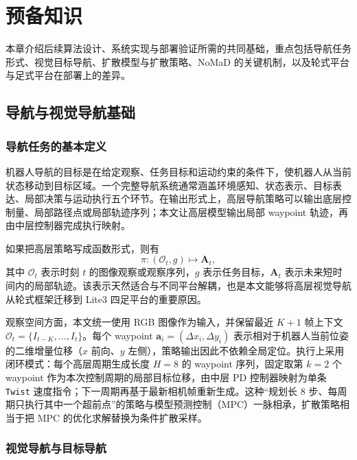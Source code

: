 
\chapter{预备知识}

本章介绍后续算法设计、系统实现与部署验证所需的共同基础，重点包括导航任务形式、视觉目标导航、扩散模型与扩散策略、NoMaD 的关键机制，以及轮式平台与足式平台在部署上的差异。

\section{导航与视觉导航基础}

\subsection{导航任务的基本定义}

机器人导航的目标是在给定观察、任务目标和运动约束的条件下，使机器人从当前状态移动到目标区域。一个完整导航系统通常涵盖环境感知、状态表示、目标表达、局部决策与运动执行五个环节\cite{thrun2005probabilistic,anderson2018evaluation}。在输出形式上，高层导航策略可以输出底层控制量、局部路径点或局部轨迹序列；本文让高层模型输出局部 waypoint 轨迹，再由中层控制器完成执行映射。

如果把高层策略写成函数形式，则有
\begin{equation}
\pi : (\mathcal{O}_t, g) \mapsto \mathbf{A}_t ,
\end{equation}
其中 $\mathcal{O}_t$ 表示时刻 $t$ 的图像观察或观察序列，$g$ 表示任务目标，$\mathbf{A}_t$ 表示未来短时间内的局部轨迹。该表示天然适合与不同平台解耦，也是本文能够将高层视觉导航从轮式框架迁移到 Lite3 四足平台的重要原因。

观察空间方面，本文统一使用 RGB 图像作为输入，并保留最近 $K+1$ 帧上下文 $\mathcal{O}_t = \{I_{t-K}, \ldots, I_t\}$。每个 waypoint $\mathbf{a}_i = (\Delta x_i, \Delta y_i)$ 表示相对于机器人当前位姿的二维增量位移（$x$ 前向、$y$ 左侧），策略输出因此不依赖全局定位。执行上采用闭环模式：每个高层周期生成长度 $H=8$ 的 waypoint 序列，固定取第 $k=2$ 个 waypoint 作为本次控制周期的局部目标位移，由中层 PD 控制器映射为单条 \texttt{Twist} 速度指令；下一周期再基于最新相机帧重新生成。这种``规划长 8 步、每周期只执行其中一个超前点''的策略与模型预测控制（MPC）一脉相承，扩散策略相当于把 MPC 的优化求解替换为条件扩散采样。

\subsection{视觉导航与目标导航}

